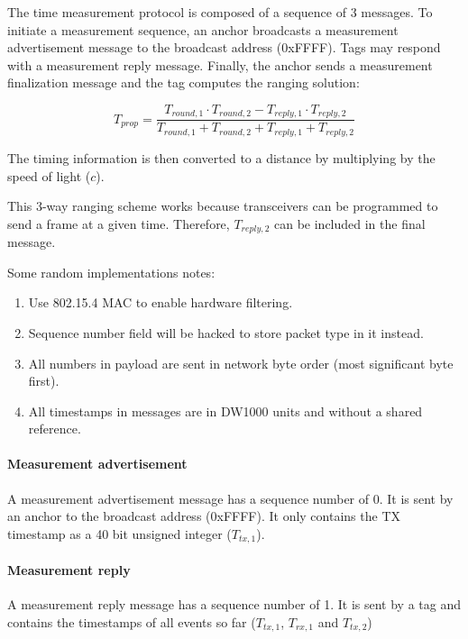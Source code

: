 \documentclass[a4paper]{scrreprt}
\begin{document}
The time measurement protocol is composed of a sequence of 3 messages.
To initiate a measurement sequence, an anchor broadcasts a measurement advertisement message to the broadcast address (0xFFFF).
Tags may respond with a measurement reply message.
Finally, the anchor sends a measurement finalization message and the tag computes the ranging solution:

\begin{equation}
T_{prop} = \frac{T_{round,1} \cdot T_{round,2} - T_{reply,1} \cdot T_{reply,2}}{T_{round,1} + T_{round,2} + T_{reply,1} + T_{reply,2}}
\label{eqn:ranging}
\end{equation}

The timing information is then converted to a distance by multiplying by the speed of light ($c$).

This 3-way ranging scheme works because transceivers can be programmed to send a frame at a given time.
Therefore, $T_{reply,2}$ can be included in the final message.

Some random implementations notes:

\begin{enumerate}
    \item Use 802.15.4 MAC to enable hardware filtering.
    \item Sequence number field will be hacked to store packet type in it instead.
    \item All numbers in payload are sent in network byte order (most significant byte first).
    \item All timestamps in messages are in DW1000 units and without a shared reference.
\end{enumerate}

\paragraph{Measurement advertisement}
A measurement advertisement message has a sequence number of 0.
It is sent by an anchor to the broadcast address (0xFFFF).
It only contains the TX timestamp as a 40 bit unsigned integer ($T_{tx,1}$).

\paragraph{Measurement reply}
A measurement reply message has a sequence number of 1.
It is sent by a tag and contains the timestamps of all events so far ($T_{tx,1}$, $T_{rx,1}$ and $T_{tx,2}$)
\end{document}
